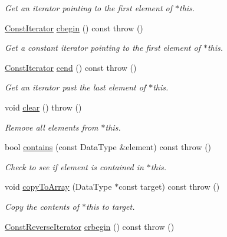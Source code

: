 \begin{DoxyCompactItemize}
\begin{DoxyCompactList}\small\item\em Get an iterator pointing to the first element of {\ttfamily $\ast$this}. \end{DoxyCompactList}\item 
\hyperlink{classVectorDeque_a5cfe4fc61668a1213c99e052450297e6}{Const\-Iterator} \hyperlink{classVectorDeque_ab50b3786dae9b81ebd8938e6e70bb02e}{cbegin} () const   throw ()
\begin{DoxyCompactList}\small\item\em Get a constant iterator pointing to the first element of {\ttfamily $\ast$this}. \end{DoxyCompactList}\item 
\hyperlink{classVectorDeque_a5cfe4fc61668a1213c99e052450297e6}{Const\-Iterator} \hyperlink{classVectorDeque_a77f86389895243f392ceabe443203e32}{cend} () const   throw ()
\begin{DoxyCompactList}\small\item\em Get an iterator past the last element of {\ttfamily $\ast$this}. \end{DoxyCompactList}\item 
void \hyperlink{classVectorDeque_afac9474353f64902fccb648c537e652f}{clear} ()  throw ()
\begin{DoxyCompactList}\small\item\em Remove all elements from {\ttfamily $\ast$this}. \end{DoxyCompactList}\item 
bool \hyperlink{classVectorDeque_ae0cbf3779a0ea9be8bbfd2409eba889f}{contains} (const Data\-Type \&element) const   throw ()
\begin{DoxyCompactList}\small\item\em Check to see if {\ttfamily element} is contained in {\ttfamily $\ast$this}. \end{DoxyCompactList}\item 
void \hyperlink{classVectorDeque_a42a1250984dcf602e225ecbe10d7cfc9}{copy\-To\-Array} (Data\-Type $\ast$const target) const   throw ()
\begin{DoxyCompactList}\small\item\em Copy the contents of {\ttfamily $\ast$this} to {\ttfamily target}. \end{DoxyCompactList}\item 
\hyperlink{classVectorDeque_a291aa5e53d483276367327acb93f3846}{Const\-Reverse\-Iterator} \hyperlink{classVectorDeque_a6577db57d37cc36ce00060baa2abfef6}{crbegin} () const   throw ()

\end{DoxyCompactItemize}
